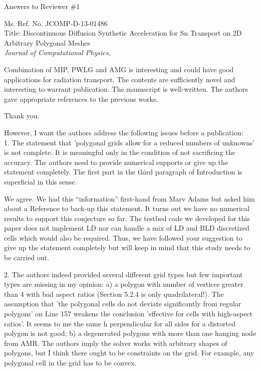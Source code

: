 \documentclass{article}
\begin{document}
\begin{center}
{ \Large Answers to Reviewer \#1}
\end{center}

\bigskip

\noindent Ms. Ref. No. JCOMP-D-13-01486\\
Title: Discontinuous Diffusion Synthetic Acceleration for Sn Transport on 2D Arbitrary Polygonal Meshes \\
{\it Journal of Computational Physics},\\

\bigskip
\bigskip

{
\color{blue}
 Combination of MIP, PWLG and AMG is interesting and could have good applications for radiation transport. The contents are sufficiently novel and interesting to warrant publication. The manuscript is well-written. The authors gave appropriate references to the previous works.
}

Thank you.

\bigskip

{
\color{blue}
However, I want the authors address the following issues before a publication:\\

1. The statement that 'polygonal grids allow for a reduced numbers of unknowns' is not complete. It is meaningful only in the condition of not sacrificing the accuracy. The authors need to provide numerical supports or give up the statement completely. The first part in the third paragraph of Introduction is superficial in this sense.
}

We agree. We had this ``information'' first-hand from Marv Adams but asked him about a Reference to back-up this statement. It turns out we have no numerical results to support this conjecture so far. The testbed code we developed for this paper does not implement LD nor can handle a mix of LD and BLD discretized cells which would also be required. Thus, we have followed your suggestion to give up the statement completely but will keep in mind that this study needs to be carried out. 

\bigskip


{
\color{blue}
2. The authors indeed provided several different grid types but few important types are missing in my opinion:
a) a polygon with number of vertices greater than 4 with bad aspect ratios (Section 5.2.4 is only quadrilateral!). The assumption that 'the polygonal cells do not deviate significantly from regular polygons' on Line 157 weakens the conclusion 'effective for cells with high-aspect ratios'. It seems to me the same h perpendicular for all sides for a distorted polygon is not good;
b) a degenerated polygons with more than one hanging node from AMR.
The authors imply the solver works with arbitrary shapes of polygons, but I think there ought to be constraints on the grid. For example, any polygonal cell in the grid has to be convex.
}
\end{document}
